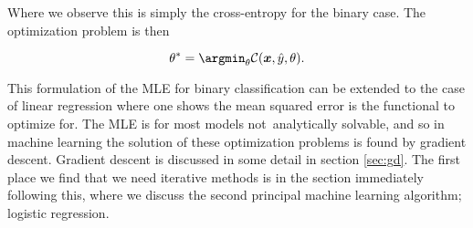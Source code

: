 \noindent Where we observe this is simply the cross-entropy for the binary case. The optimization problem is then 

\begin{equation}
\theta^* = \argmin_\theta \mathcal{C}(\boldsymbol{x}, \hat{y}, \theta ).
\end{equation}

\noindent This formulation of the MLE for binary classification can be extended to the case of linear regression where one shows the mean squared error is the functional to optimize for. The MLE  is for most models not analytically solvable, and so in machine learning the solution of these optimization problems is found by gradient descent. Gradient descent is discussed in some detail in section \ref{sec:gd}. The first place we find that we need iterative methods is in the section immediately following this, where we discuss the second principal machine learning algorithm; logistic regression.